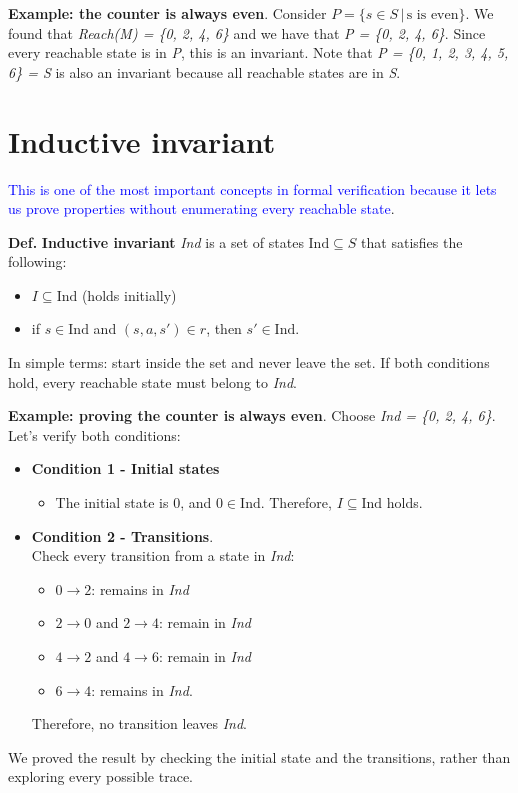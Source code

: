 \documentclass[11pt]{article}
\begin{document}
\textbf{Example: the counter is always even}. Consider $P = \{ s \in S \, | \, \text{s is even} \}$. We found that \textit{Reach(M) = \{0, 2, 4, 6\}} and we have that \textit{P = \{0, 2, 4, 6\}}. Since every reachable state is in \textit{P}, this is an invariant. Note that \textit{P = \{0, 1, 2, 3, 4, 5, 6\} = S} is also an invariant because all reachable states are in \textit{S}.  

\section*{Inductive invariant}

\textcolor{blue}{This is one of the most important concepts in formal verification because it lets us prove properties without enumerating every reachable state}. 

\begin{tcolorbox}[
    enhanced,
    frame hidden,
    borderline west={2pt}{0pt}{black},
    boxsep=5pt,
    left=8pt
]
\textbf{Def.} \textbf{Inductive invariant} \textit{Ind} is a set of states $\text{Ind} \subseteq S$ that satisfies the following:
\begin{itemize}
	\item $I \subseteq \text{Ind}$ (holds initially)
	\item if $s \in \text{Ind}$ and $(s, a, s') \in r$, then $s' \in \text{Ind}$. \\
\end{itemize}

In simple terms: start inside the set and never leave the set. If both conditions hold, every reachable state must belong to \textit{Ind}.
\end{tcolorbox}

\textbf{Example: proving the counter is always even}. Choose \textit{Ind = \{0, 2, 4, 6\}}. Let's verify both conditions:
\begin{itemize}
	\item \textbf{Condition 1 - Initial states}
		\begin{itemize}
			\item The initial state is $0$, and $0 \in \text{Ind}$. Therefore, $I \subseteq \text{Ind}$ holds.
		\end{itemize}
	\item \textbf{Condition 2 - Transitions}. \\
		Check every transition from a state in \textit{Ind}:
		\begin{itemize}
			\item $0 \rightarrow 2$: remains in \textit{Ind}
			\item $2 \rightarrow 0$ and $2 \rightarrow 4$: remain in \textit{Ind}
			\item $4 \rightarrow 2$ and $4 \rightarrow 6$: remain in \textit{Ind}
			\item $6 \rightarrow 4$: remains in \textit{Ind}.
\end{itemize}
	Therefore, no transition leaves \textit{Ind}.
\end{itemize}

We proved the result by checking the initial state and the transitions, rather than exploring every possible trace. 
\end{document}
